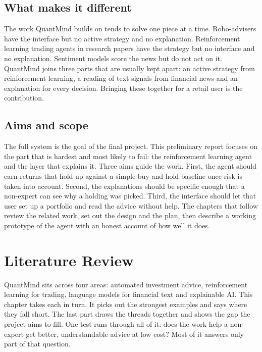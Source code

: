 \documentclass[12pt,twoside,letterpaper]{article}
\begin{document}
\subsection{What makes it different}

The work QuantMind builds on tends to solve one piece at a time. Robo-advisers have
the interface but no active strategy and no explanation. Reinforcement learning
trading agents in research papers have the strategy but no interface and no
explanation. Sentiment models score the news but do not act on it. QuantMind joins
three parts that are usually kept apart: an active strategy from reinforcement
learning, a reading of text signals from financial news and an explanation for
every decision. Bringing these together for a retail user is the contribution.

\subsection{Aims and scope}

The full system is the goal of the final project. This preliminary report focuses
on the part that is hardest and most likely to fail: the reinforcement learning
agent and the layer that explains it. Three aims guide the work. First, the agent
should earn returns that hold up against a simple buy-and-hold baseline once risk
is taken into account. Second, the explanations should be specific enough that a
non-expert can see why a holding was picked. Third, the interface should let that
user set up a portfolio and read the advice without help. The chapters that follow
review the related work, set out the design and the plan, then describe a working
prototype of the agent with an honest account of how well it does.

\section{Literature Review}

QuantMind sits across four areas: automated investment advice, reinforcement
learning for trading, language models for financial text and explainable AI. This
chapter takes each in turn. It picks out the strongest examples and says where they
fall short. The last part draws the threads together and shows the gap the project
aims to fill. One test runs through all of it: does the work help a non-expert get
better, understandable advice at low cost? Most of it answers only part of that
question.
\end{document}
